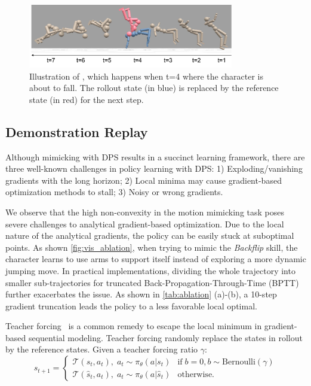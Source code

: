 \begin{figure}[t!]
\includegraphics[width=0.8\textwidth]{figures/qp/expert_replay5.pdf}
\centering
\caption{Illustration of \ourmethod{}, which happens when t=4 where the character is about to fall. The rollout state (in blue) is replaced by the reference state (in red) for the next step.}
\end{figure}
\subsection{Demonstration Replay}
Although mimicking with DPS results in a succinct learning framework, there are three well-known challenges in policy learning with DPS: 1) Exploding/vanishing gradients with the long horizon; 2) Local minima may cause gradient-based optimization methods to stall; 3) Noisy or wrong gradients.

We observe that the high non-convexity in the motion mimicking task poses severe challenges to analytical gradient-based optimization. Due to the local nature of the analytical gradients, the policy can be easily stuck at suboptimal points. As shown \autoref{fig:vis_ablation}, when trying to mimic the \textit{Backflip} skill, the character learns to use arms to support itself instead of exploring a more dynamic jumping move. 
In practical implementations, dividing the whole trajectory into smaller sub-trajectories for truncated Back-Propagation-Through-Time (BPTT) further exacerbates the issue.
As shown in \autoref{tab:ablation} (a)-(b), a 10-step gradient truncation leads the policy to a less favorable local optimal.

Teacher forcing~\citep{williams1989learning} is a common remedy to escape the local minimum in gradient-based sequential modeling. Teacher forcing randomly replace the states in rollout by the reference states.
Given a teacher forcing ratio $\gamma$:
\begin{equation}
  s_{t+1} =
    \begin{cases}
      \mathcal{T}(s_{t}, a_t), \; a_t \sim \pi_{\theta}(a|s_{t}) & \text{if} \; b=0, b\sim \textrm{Bernoulli}(\gamma)\\
      \mathcal{T}(\hat{s}_{t}, a_t), \; a_t \sim \pi_{\theta}(a|\hat{s}_{t}) & \text{otherwise.}
    \end{cases}       
\end{equation}   


